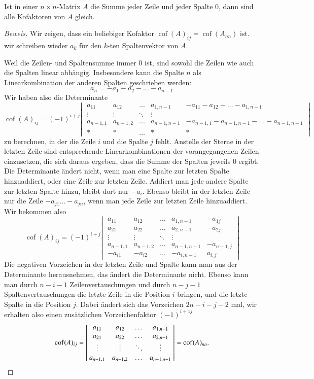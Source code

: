 \begin{hilfssatz}
Ist in einer $n\times n$-Matrix $A$ die Summe jeder Zeile und jeder
Spalte $0$, dann sind alle Kofaktoren von $A$ gleich.
\end{hilfssatz}
\begin{proof}[Beweis]
Wir zeigen, dass ein beliebiger Kofaktor
$\operatorname{cof}(A)_{ij}=\operatorname{cof}(A_{nn})$ ist.
wir schreiben wieder $a_k$ für den $k$-ten Spaltenvektor von $A$.

Weil die Zeilen- und Spaltensumme immer $0$ ist, sind sowohl die
Zeilen wie auch die Spalten linear abhängig. Insbesondere kann die Spalte
$n$ als Linearkombination der anderen Spalten geschrieben werden:
\[
a_n=-a_1-a_2-\dots-a_{n-1}
\]
Wir haben also die Determinante
\[
\operatorname{cof}(A)_{ij}
=
(-1)^{i+j}
\left|\;
\begin{matrix}
a_{11}&a_{12}&\dots &a_{1,n-1}&-a_{11}-a_{12}-\dots-a_{1,n-1}\\
\vdots&\vdots&\ddots&\vdots\\
a_{n-1,1}&a_{n-1,2}&\dots&a_{n-1,n-1}&-a_{n-1,1}-a_{n-1,n-1}-\dots-a_{n-1,n-1}\\
*&*&\dots&*&*
\end{matrix}
\;\right|
\]
zu berechnen, in der die Zeile $i$ und die Spalte $j$ fehlt. Anstelle
der Sterne in der letzten Zeile sind entsprechende Linearkombinationen
der vorangegangenen Zeilen einzusetzen, die sich daraus ergeben,
dass die Summe der Spalten jeweils $0$ ergibt.
Die Determinante ändert nicht, wenn man eine Spalte zur letzten Spalte
hinzuaddiert, oder eine Zeile zur letzten Zeile. Addiert man jede
andere Spalte zur letzten Spalte hinzu, bleibt dort nur $-a_i$.
Ebenso bleibt in der letzten Zeile nur die Zeile $-a_{j1}\dots-a_{jn}$,
wenn man jede Zeile zur letzten Zeile hinzuaddiert. Wir bekommen also
\[
\operatorname{cof}(A)_{ij}
=
(-1)^{i+j}
\left|\;
\begin{matrix}
a_{11}&a_{12}&\dots &a_{1,n-1}&-a_{1j}\\
a_{21}&a_{22}&\dots &a_{2,n-1}&-a_{2j}\\
\vdots&\vdots&\ddots&\vdots\\
a_{n-1,1}&a_{n-1,2}&\dots&a_{n-1,n-1}&-a_{n-1,j}\\
-a_{i1}&-a_{i2}&\dots&-a_{i,n-1}&a_{i,j}
\end{matrix}
\;\right|
\]
Die negativen Vorzeichen in der letzten Zeile und Spalte kann man aus
der Determinante herausnehmen, das ändert die Determinante nicht.
Ebenso kann man durch $n-i-1$ Zeilenvertauschungen und durch
$n-j-1$ Spaltenvertauschungen die letzte Zeile in die
Position $i$ bringen, und die letzte Spalte in die Position $j$.
Dabei ändert sich das Vorzeichen $2n-i-j-2$ mal, wir erhalten also
einen zusätzlichen Vorzeichenfaktor $(-1)^{i+1j}$
\[
\operatorname{cof}(A)_{ij}=
\left|\;
\begin{matrix}
a_{11}&a_{12}&\dots&a_{1,n-1}\\
a_{21}&a_{22}&\dots&a_{2,n-1}\\
\vdots&\vdots&\ddots&\vdots\\
a_{n-1,1}&a_{n-1,2}&\dots&a_{n-1,n-1}
\end{matrix}
\;\right|
=\operatorname{cof}(A)_{nn}.
\qedhere
\]
\end{proof}
